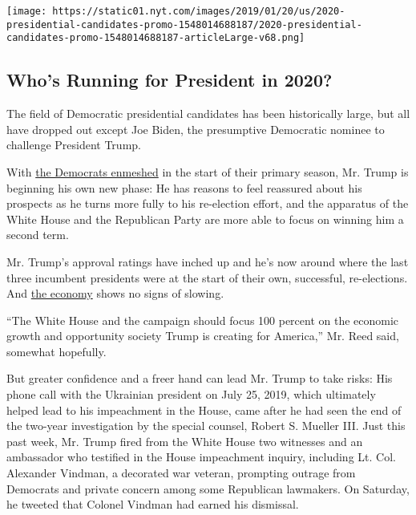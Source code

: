 \href{https://www.nytimes.com/interactive/2019/us/politics/2020-presidential-candidates.html}{}

\texttt{[image: https://static01.nyt.com/images/2019/01/20/us/2020-presidential-candidates-promo-1548014688187/2020-presidential-candidates-promo-1548014688187-articleLarge-v68.png]}

\hypertarget{whos-running-for-president-in-2020}{%
\subsection{Who's Running for President in
2020?}\label{whos-running-for-president-in-2020}}

The field of Democratic presidential candidates has been historically
large, but all have dropped out except Joe Biden, the presumptive
Democratic nominee to challenge President Trump.

With
\href{https://www.nytimes.com/2020/02/06/us/politics/democratic-iowa-caucuses.html}{the
Democrats enmeshed} in the start of their primary season, Mr. Trump is
beginning his own new phase: He has reasons to feel reassured about his
prospects as he turns more fully to his re-election effort, and the
apparatus of the White House and the Republican Party are more able to
focus on winning him a second term.

Mr. Trump's approval ratings have inched up and he's now around where
the last three incumbent presidents were at the start of their own,
successful, re-elections. And
\href{https://www.nytimes.com/2020/02/07/upshot/election-year-economy-trump.html}{the
economy} shows no signs of slowing.

``The White House and the campaign should focus 100 percent on the
economic growth and opportunity society Trump is creating for America,''
Mr. Reed said, somewhat hopefully.

But greater confidence and a freer hand can lead Mr. Trump to take
risks: His phone call with the Ukrainian president on July 25, 2019,
which ultimately helped lead to his impeachment in the House, came after
he had seen the end of the two-year investigation by the special
counsel, Robert S. Mueller III. Just this past week, Mr. Trump fired
from the White House two witnesses and an ambassador who testified in
the House impeachment inquiry, including Lt. Col. Alexander Vindman, a
decorated war veteran, prompting outrage from Democrats and private
concern among some Republican lawmakers. On Saturday, he tweeted that
Colonel Vindman had earned his dismissal.

